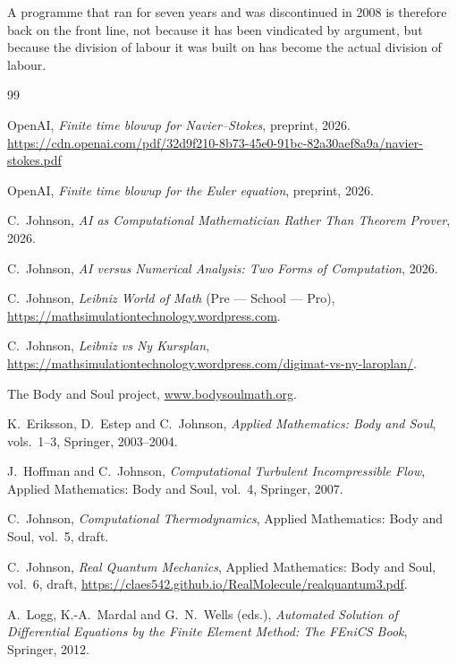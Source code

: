 \documentclass[11pt]{article}
\begin{document}
A programme that ran for seven years and was discontinued in 2008 is therefore back on the front
line, not because it has been vindicated by argument, but because the division of labour it was
built on has become the actual division of labour.

\begin{thebibliography}{99}

 OpenAI, \emph{Finite time blowup for Navier--Stokes}, preprint, 2026.
\newblock \url{https://cdn.openai.com/pdf/32d9f210-8b73-45e0-91bc-82a30aef8a9a/navier-stokes.pdf}

 OpenAI, \emph{Finite time blowup for the Euler equation}, preprint, 2026.

 C.~Johnson, \emph{AI as Computational Mathematician Rather Than Theorem
Prover}, 2026.

 C.~Johnson, \emph{AI versus Numerical Analysis: Two Forms of Computation}, 2026.

 C.~Johnson, \emph{Leibniz World of Math} (Pre --- School --- Pro),
\url{https://mathsimulationtechnology.wordpress.com}.

 C.~Johnson, \emph{Leibniz vs Ny Kursplan},
\url{https://mathsimulationtechnology.wordpress.com/digimat-vs-ny-laroplan/}.

 The Body and Soul project, \url{www.bodysoulmath.org}.

 K.~Eriksson, D.~Estep and C.~Johnson, \emph{Applied Mathematics: Body and Soul},
vols.~1--3, Springer, 2003--2004.

 J.~Hoffman and C.~Johnson, \emph{Computational Turbulent Incompressible Flow},
Applied Mathematics: Body and Soul, vol.~4, Springer, 2007.

 C.~Johnson, \emph{Computational Thermodynamics}, Applied Mathematics: Body and
Soul, vol.~5, draft.

 C.~Johnson, \emph{Real Quantum Mechanics}, Applied Mathematics: Body and Soul,
vol.~6, draft, \url{https://claes542.github.io/RealMolecule/realquantum3.pdf}.

 A.~Logg, K.-A.~Mardal and G.~N.~Wells (eds.), \emph{Automated Solution of
Differential Equations by the Finite Element Method: The FEniCS Book}, Springer, 2012.

\end{thebibliography}
\end{document}
